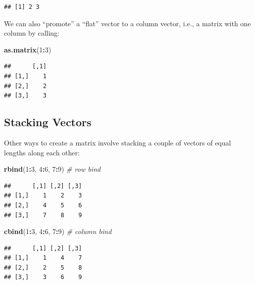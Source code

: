 \documentclass[10pt,b5paper,krantz1]{krantz}
\newenvironment{Shaded}{\begin{snugshade}}{\end{snugshade}}
\newcommand{\CommentTok}[1]{\textcolor[rgb]{0.37,0.37,0.37}{\textit{#1}}}
\newcommand{\DecValTok}[1]{\textcolor[rgb]{0.06,0.06,0.06}{#1}}
\newcommand{\KeywordTok}[1]{\textcolor[rgb]{0.27,0.27,0.27}{\textbf{#1}}}
\newcommand{\NormalTok}[1]{#1}
\newcommand{\OperatorTok}[1]{\textcolor[rgb]{0.43,0.43,0.43}{\textbf{#1}}}
\begin{document}
\begin{verbatim}
## [1] 2 3
\end{verbatim}

We can also ``promote'' a ``flat'' vector to a column vector, i.e.,
a matrix with one column by calling:

\begin{Shaded}
\begin{Highlighting}[]
\KeywordTok{as.matrix}\NormalTok{(}\DecValTok{1}\OperatorTok{:}\DecValTok{3}\NormalTok{)}
\end{Highlighting}
\end{Shaded}

\begin{verbatim}
##      [,1]
## [1,]    1
## [2,]    2
## [3,]    3
\end{verbatim}

\hypertarget{stacking-vectors}{%
\subsection{Stacking Vectors}\label{stacking-vectors}}

Other ways to create a matrix involve stacking a couple of vectors
of equal lengths along each other:

\begin{Shaded}
\begin{Highlighting}[]
\KeywordTok{rbind}\NormalTok{(}\DecValTok{1}\OperatorTok{:}\DecValTok{3}\NormalTok{, }\DecValTok{4}\OperatorTok{:}\DecValTok{6}\NormalTok{, }\DecValTok{7}\OperatorTok{:}\DecValTok{9}\NormalTok{) }\CommentTok{# row bind}
\end{Highlighting}
\end{Shaded}

\begin{verbatim}
##      [,1] [,2] [,3]
## [1,]    1    2    3
## [2,]    4    5    6
## [3,]    7    8    9
\end{verbatim}

\begin{Shaded}
\begin{Highlighting}[]
\KeywordTok{cbind}\NormalTok{(}\DecValTok{1}\OperatorTok{:}\DecValTok{3}\NormalTok{, }\DecValTok{4}\OperatorTok{:}\DecValTok{6}\NormalTok{, }\DecValTok{7}\OperatorTok{:}\DecValTok{9}\NormalTok{) }\CommentTok{# column bind}
\end{Highlighting}
\end{Shaded}

\begin{verbatim}
##      [,1] [,2] [,3]
## [1,]    1    4    7
## [2,]    2    5    8
## [3,]    3    6    9
\end{verbatim}
\end{document}
